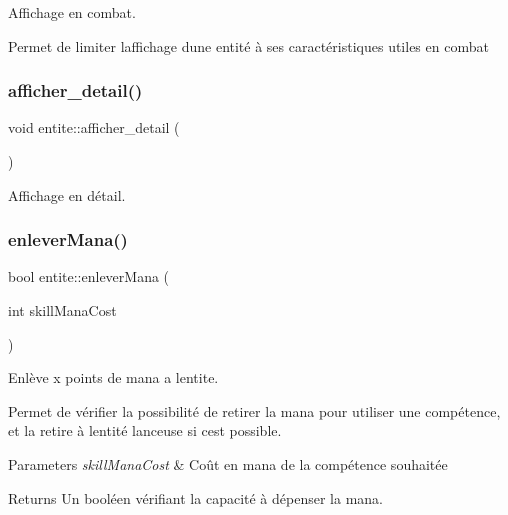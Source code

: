 Affichage en combat. 

Permet de limiter l\textquotesingle{}affichage d\textquotesingle{}une entité à ses caractéristiques utiles en combat \mbox{\label{classentite_af6ddcb65074eef70bdac220a5a3ed4cf}} 
\subsubsection{\texorpdfstring{afficher\+\_\+detail()}{afficher\_detail()}}
{\footnotesize\ttfamily void entite\+::afficher\+\_\+detail (\begin{DoxyParamCaption}{ }\end{DoxyParamCaption})}



Affichage en détail. 

\mbox{\label{classentite_a48c1c38c58bbfa074885ac45a2584772}} 
\subsubsection{\texorpdfstring{enlever\+Mana()}{enleverMana()}}
{\footnotesize\ttfamily bool entite\+::enlever\+Mana (\begin{DoxyParamCaption}\item[{int}]{skill\+Mana\+Cost }\end{DoxyParamCaption})}



Enlève x points de mana a l\textquotesingle{}entite. 

Permet de vérifier la possibilité de retirer la mana pour utiliser une compétence, et la retire à l\textquotesingle{}entité lanceuse si c\textquotesingle{}est possible. 
\begin{DoxyParams}{Parameters}
{\em skill\+Mana\+Cost} & Coût en mana de la compétence souhaitée \\
\hline
\end{DoxyParams}
\begin{DoxyReturn}{Returns}
Un booléen vérifiant la capacité à dépenser la mana. 
\end{DoxyReturn}
\mbox{\label{classentite_a74d72bf499b3b3f9dab723cf0dd88d01}} 
